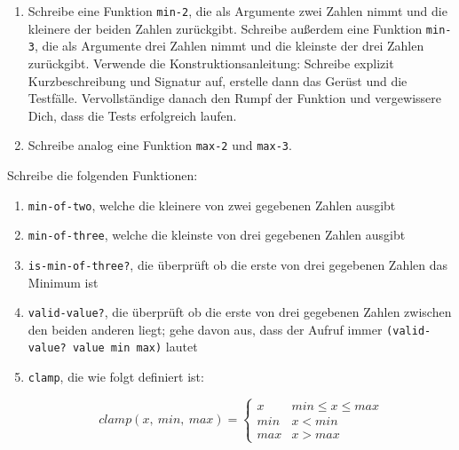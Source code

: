 \begin{aufgabe}

  \begin{enumerate}

  \item Schreibe eine Funktion \texttt{min-2}, die als Argumente zwei
    Zahlen nimmt und die kleinere der beiden Zahlen zurückgibt.  Schreibe
    außerdem eine Funktion \texttt{min-3}, die als Argumente drei
    Zahlen nimmt und die kleinste der drei Zahlen zurückgibt.  Verwende
    die Konstruktionsanleitung: Schreibe
    explizit Kurzbeschreibung und Signatur auf, erstelle dann das
    Gerüst und die Testfälle.  Vervollständige danach den Rumpf der
    Funktion und vergewissere Dich, dass die Tests erfolgreich laufen.
    
  \item Schreibe analog eine Funktion \texttt{max-2} und \texttt{max-3}.
    
  \end{enumerate}
\end{aufgabe}

\begin{aufgabe}
  Schreibe die folgenden Funktionen:
  \begin{enumerate}
  \item \texttt{min-of-two}, welche die kleinere von zwei
    gegebenen Zahlen ausgibt
  \item \texttt{min-of-three}, welche die kleinste von drei
    gegebenen Zahlen ausgibt
  \item \texttt{is-min-of-three?}, die überprüft ob die erste
    von drei gegebenen Zahlen das Minimum ist
  \item \texttt{valid-value?}, die überprüft ob die erste von
    drei gegebenen Zahlen zwischen den beiden anderen liegt; gehe
    davon aus, dass der Aufruf immer \texttt{(valid-value? value min max)}
    lautet 
  \item \texttt{clamp}, die wie folgt definiert ist:
    
    \[\mathit{clamp}(x,\ \mathit{min},\ \mathit{max})=
    \begin{cases} 
      x & \mathit{min} \leq x \leq \mathit{max}\\ 
      \mathit{min} & x < \mathit{min} \\ 
      \mathit{max} & x > \mathit{max}
    \end{cases}
    \]
    
  \end{enumerate}
\end{aufgabe}

